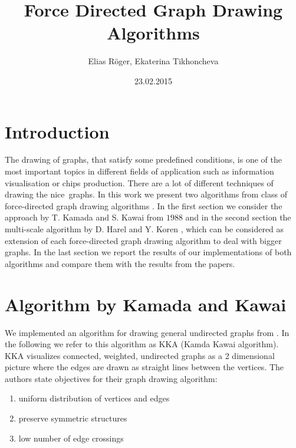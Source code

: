 \documentclass[12pt,a4paper]{article}
\author{Elias Röger, Ekaterina Tikhoncheva}
\title{Force Directed Graph Drawing Algorithms}
\date{23.02.2015}
\begin{document}
\maketitle

\section{Introduction}

The drawing of graphs, that satisfy some predefined conditions, is one of the most important topics in different fields of application such as information visualisation or chips production. There are a lot of different techniques of drawing the \glqq nice\grqq\ graphs. In this work we present two algorithms from class of force-directed graph drawing algorithms \cite{Kobouro}. In the first section we consider the approach by T. Kamada and S. Kawai \cite{TomihisaKamada1989} from $1988$ and in the second section the multi-scale algorithm by D. Harel and Y. Koren \cite{DavidHarel2002}, which can be considered as extension of each force-directed graph drawing algorithm to deal with bigger graphs. In the last section we report the results of our implementations of both algorithms and compare them with the results from the papers.


\section{Algorithm by Kamada and Kawai}
\label{section1}

We implemented an algorithm for drawing general undirected graphs from \cite{TomihisaKamada1989}. In the following we refer to this algorithm as KKA (Kamda Kawai algorithm). \\ KKA visualizes connected, weighted, undirected graphs as a 2 dimensional picture where the edges are drawn as straight lines between the vertices. The authors state objectives for their graph drawing algorithm:
\begin{enumerate}
	\item uniform distribution of vertices and edges
	\item preserve symmetric structures
	\item low number of edge crossings
\end{enumerate}
\end{document}
